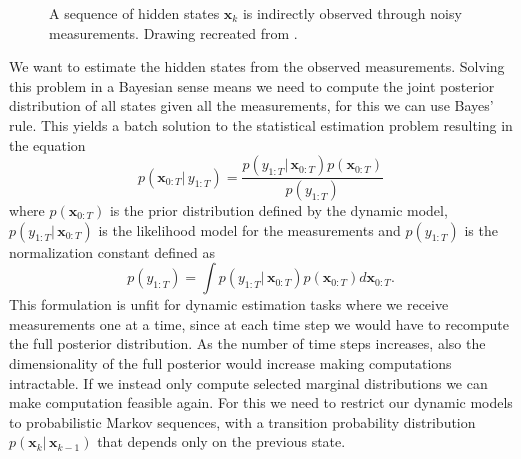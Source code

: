 \begin{figure}[ht!]
    \centering
 \caption{A sequence of  hidden states $\mathbf{x}_k$ is indirectly
 observed through noisy measurements. Drawing recreated from \citep{sarkka2013bayesian}.}
    \label{fig:inversion}
\end{figure}


We want to estimate the hidden states from the observed
measurements. Solving this problem in a Bayesian
sense means we 
need to compute the joint posterior distribution of all
states given all the measurements, for this we can
use Bayes' rule.
This yields a batch solution to the statistical estimation problem
resulting in the equation
\begin{equation}
  \label{eq:bayes}
  p(\mathbf{x}_{0:T} |\, y_{1:T})
  = \frac{p(y_{1:T} |\, \mathbf{x}_{0:T}) p(\mathbf{x}_{0:T})}
  {p(y_{1:T})}
\end{equation}
where $p(\mathbf{x}_{0:T})$ is the prior distribution defined by the dynamic
model, $p(y_{1:T} |\, \mathbf{x}_{0:T})$ is the likelihood model for the
measurements and $p(y_{1:T})$ is the normalization constant defined as
$$ p(y_{1:T}) = \int p(y_{1:T} |\, \mathbf{x}_{0:T})
p(\mathbf{x}_{0:T}) d \mathbf{x}_{0:T}.$$
This formulation is unfit for dynamic estimation tasks where
we receive measurements one at a time, since
at each time step we would have to
recompute the full posterior distribution. As the number of
time steps increases, also the dimensionality of the full posterior
would increase making computations intractable.
If we instead only compute selected marginal distributions we can
make computation feasible again. For this we need to restrict
our dynamic models to probabilistic Markov sequences, with a
transition probability distribution $p(\mathbf{x}_k |\, \mathbf{x}_{k-1})$
that depends only on the previous state.


